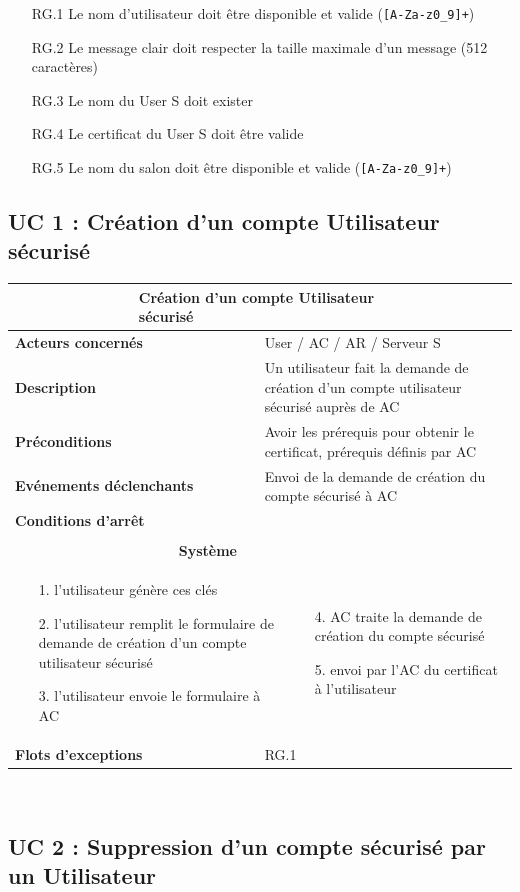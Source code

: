 \documentclass[a4paper,11pt,french]{article}
\newcommand{\fiche}[9] {
	\noindent
\begin{tabular}{|p{3.5cm}| p{1cm} | p{3cm} | p{.5cm} | p{7cm}|} 
\hline
\rowcolor{blue}
\multicolumn{2}{|l|}{\color{white}\bfseries{Nom}} & \multicolumn{3}{l|}{\color{white}\bfseries{#1}}\\
\hline
\multicolumn{2}{|l|}{\bfseries{Acteurs concernés}} & \multicolumn{3}{m{10.5cm}|}{#2}\\
\hline
\multicolumn{2}{|l|}{\bfseries{Description}} & \multicolumn{3}{m{10.5cm}|}{#3}\\
\hline
\multicolumn{2}{|l|}{\bfseries{Préconditions}} & \multicolumn{3}{m{10.5cm}|}{#4}\\
\hline
\multicolumn{2}{|l|}{\bfseries{Evénements déclenchants}} & \multicolumn{3}{m{10.5cm}|}{#5}\\
\hline
\multicolumn{2}{|l|}{\bfseries{Conditions d'arrêt}} & \multicolumn{3}{m{10.5cm}|}{#6}\\
\hline
\rowcolor{gray}
\multicolumn{5}{|c|}{\bfseries{Description du flot d'événements principal}}\\
\hline
\rowcolor{gray}
\multicolumn{3}{|c|}{\bfseries{Acteur(s)}} & \multicolumn{2}{c|}{\bfseries{Système}}\\
\hline
\multicolumn{3}{|p{7.5cm}|}{#7} & \multicolumn{2}{p{7.5cm}|}{#8}\\
\hline
\multicolumn{2}{|l}{\bfseries{Flots d'exceptions}} & \multicolumn{3}{|p{11.5cm}|}{#9}\\
\hline
\end{tabular}
\\
}
\begin{document}
\newpage
\begin{itemize}
\item [RG.1] Le nom d'utilisateur doit être disponible et valide (\verb![A-Za-z0_9]+!)
\item [RG.2] Le message clair doit respecter la taille maximale d'un message (512 caractères)
\item [RG.3] Le nom du User S doit exister
\item [RG.4] Le certificat du User S doit être valide
\item [RG.5] Le nom du salon doit être disponible et valide (\verb![A-Za-z0_9]+!)
\end{itemize}
\subsection{UC 1 : Création d'un compte Utilisateur sécurisé}

\fiche
	{Création d'un compte Utilisateur sécurisé} %
	{User / AC / AR / Serveur S} %
	{Un utilisateur fait la demande de création d’un compte utilisateur sécurisé auprès de AC} %
	{Avoir les prérequis pour obtenir le certificat, prérequis définis par AC} %
	{Envoi de la demande de création du compte sécurisé à AC} %
	{} %
	{\begin{itemize}  %
		\item [1.] l’utilisateur génère ces clés
		\item [2.] l’utilisateur remplit le formulaire de demande de création d’un compte utilisateur sécurisé 
		\item [3.] l’utilisateur envoie le formulaire à AC  
	 \end{itemize}
	} 
	{\begin{itemize}  %
		\item []
		\item []
		\item [4.] AC traite la demande de création du compte sécurisé
		\item [5.] envoi par l'AC du certificat à l'utilisateur
	\end{itemize}
	 }
	{RG.1} %

\subsection{UC 2 : Suppression d’un compte sécurisé par un Utilisateur}
\end{document}
